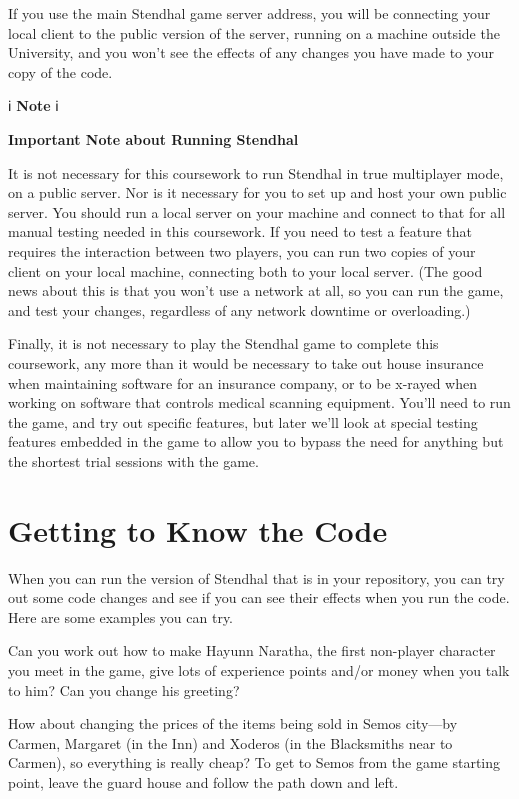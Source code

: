 \documentclass[
]{book}
\begin{document}
If you use the main Stendhal game server address, you will be connecting your local client to the public version of the server, running on a machine outside the University, and you won't see the effects of any changes you have made to your copy of the code.

ℹ️ \textbf{Note} ℹ️

\textbf{Important Note about Running Stendhal}

It is not necessary for this coursework to run Stendhal in true multiplayer mode, on a public server. Nor is it necessary for you to set up and host your own public server. You should run a local server on your machine and connect to that for all manual testing needed in this coursework. If you need to test a feature that requires the interaction between two players, you can run two copies of your client on your local machine, connecting both to your local server. (The good news about this is that you won't use a network at all, so you can run the game, and test your changes, regardless of any network downtime or overloading.)

Finally, it is not necessary to play the Stendhal game to complete this coursework, any more than it would be necessary to take out house insurance when maintaining software for an insurance company, or to be x-rayed when working on software that controls medical scanning equipment. You'll need to run the game, and try out specific features, but later we'll look at special testing features embedded in the game to allow you to bypass the need for anything but the shortest trial sessions with the game.

\hypertarget{knowcode}{%
\section{Getting to Know the Code}\label{knowcode}}

When you can run the version of Stendhal that is in your repository, you can try out some code changes and see if you can see their effects when you run the code. Here are some examples you can try.

Can you work out how to make Hayunn Naratha, the first non-player character you meet in the game, give lots of experience points and/or money when you talk to him? Can you change his greeting?

How about changing the prices of the items being sold in Semos city---by Carmen, Margaret (in the Inn) and Xoderos (in the Blacksmiths near to Carmen), so everything is really cheap? To get to Semos from the game starting point, leave the guard house and follow the path down and left.
\end{document}
